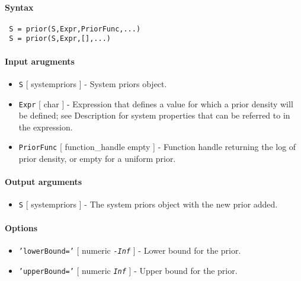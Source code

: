 


	\paragraph{Syntax}
 
 \begin{verbatim}
 S = prior(S,Expr,PriorFunc,...)
 S = prior(S,Expr,[],...)
 \end{verbatim}
 
 \paragraph{Input arugments}
 
 \begin{itemize}
 \item
   \texttt{S} {[} systempriors {]} - System priors object.
 \item
   \texttt{Expr} {[} char {]} - Expression that defines a value for which
   a prior density will be defined; see Description for system properties
   that can be referred to in the expression.
 \item
   \texttt{PriorFunc} {[} function\_handle \textbar{} empty {]} -
   Function handle returning the log of prior density, or empty for a
   uniform prior.
 \end{itemize}
 
 \paragraph{Output arguments}
 
 \begin{itemize}
 \item
   \texttt{S} {[} systempriors {]} - The system priors object with the
   new prior added.
 \end{itemize}
 
 \paragraph{Options}
 
 \begin{itemize}
 \item
   \texttt{'lowerBound='} {[} numeric \textbar{} \emph{\texttt{-Inf}} {]}
   - Lower bound for the prior.
 \item
   \texttt{'upperBound='} {[} numeric \textbar{} \emph{\texttt{Inf}} {]}
   - Upper bound for the prior.
 \end{itemize}
 

